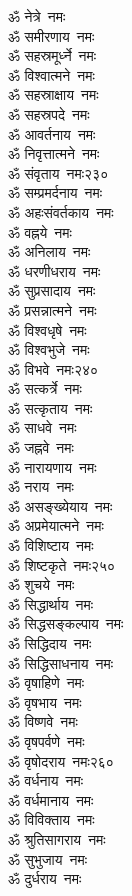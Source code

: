 \begin{multicols}{2}
\begin{flushleft}
ॐ नेत्रे~नमः\\
ॐ समीरणाय~नमः\\
ॐ सहस्रमूर्ध्ने~नमः\\
ॐ विश्वात्मने~नमः\\
ॐ सहस्राक्षाय~नमः\\
ॐ सहस्रपदे~नमः\\
ॐ आवर्तनाय~नमः\\
ॐ निवृत्तात्मने~नमः\\
ॐ संवृताय~नमः\hfill २३०\\
ॐ सम्प्रमर्दनाय~नमः\\
ॐ अहःसंवर्तकाय~नमः\\
ॐ वह्नये~नमः\\
ॐ अनिलाय~नमः\\
ॐ धरणीधराय~नमः\\
ॐ सुप्रसादाय~नमः\\
ॐ प्रसन्नात्मने~नमः\\
ॐ विश्वधृषे~नमः\\
ॐ विश्वभुजे~नमः\\
ॐ विभवे~नमः\hfill २४०\\
ॐ सत्कर्त्रे~नमः\\
ॐ सत्कृताय~नमः\\
ॐ साधवे~नमः\\
ॐ जह्नवे~नमः\\
ॐ नारायणाय~नमः\\
ॐ नराय~नमः\\
ॐ असङ्ख्येयाय~नमः\\
ॐ अप्रमेयात्मने~नमः\\
ॐ विशिष्टाय~नमः\\
ॐ शिष्टकृते~नमः\hfill २५०\\
ॐ शुचये~नमः\\
ॐ सिद्धार्थाय~नमः\\
ॐ सिद्धसङ्कल्पाय~नमः\\
ॐ सिद्धिदाय~नमः\\
ॐ सिद्धिसाधनाय~नमः\\
ॐ वृषाहिणे~नमः\\
ॐ वृषभाय~नमः\\
ॐ विष्णवे~नमः\\
ॐ वृषपर्वणे~नमः\\
ॐ वृषोदराय~नमः\hfill २६०\\
ॐ वर्धनाय~नमः\\
ॐ वर्धमानाय~नमः\\
ॐ विविक्ताय~नमः\\
ॐ श्रुतिसागराय~नमः\\
ॐ सुभुजाय~नमः\\
ॐ दुर्धराय~नमः\\

\end{flushleft}
\end{multicols}
